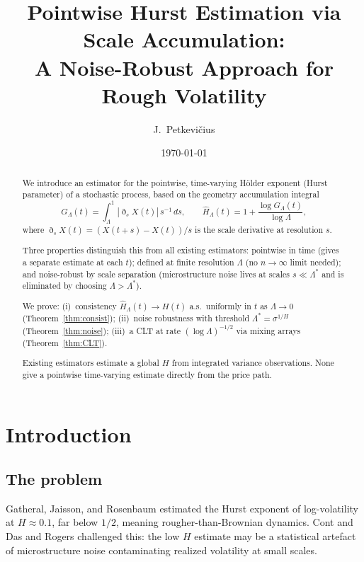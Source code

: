 \documentclass[11pt,a4paper]{article}
\title{Pointwise Hurst Estimation via Scale Accumulation:\\
A Noise-Robust Approach for Rough Volatility}
\author{J.\ Petkevi\v{c}ius}
\date{\today}
\theoremstyle{definition}
\theoremstyle{remark}
\newcommand{\GL}{G_\Lambda}
\newcommand{\Hhat}{\hat{H}_\Lambda}
\begin{document}
\maketitle

\begin{abstract}
We introduce an estimator for the pointwise, time-varying H\"{o}lder
exponent (Hurst parameter) of a stochastic process, based on the
geometry accumulation integral
\[
  \GL(t) = \int_\Lambda^1 |\eth_s X(t)|\,s^{-1}\,ds,
  \qquad
  \Hhat(t) = 1 + \frac{\log \GL(t)}{\log\Lambda},
\]
where $\eth_s X(t)=(X(t+s)-X(t))/s$ is the scale derivative at
resolution $s$.

Three properties distinguish this from all existing estimators:
pointwise in time (gives a separate estimate at each $t$); defined at
finite resolution $\Lambda$ (no $n\to\infty$ limit needed); and
noise-robust by scale separation (microstructure noise lives at scales
$s\ll\Lambda^*$ and is eliminated by choosing $\Lambda>\Lambda^*$).

We prove: (i)~consistency $\Hhat(t)\to H(t)$ a.s.\ uniformly in $t$
as $\Lambda\to0$ (Theorem~\ref{thm:consist}); (ii)~noise robustness
with threshold $\Lambda^*=\sigma^{1/H}$ (Theorem~\ref{thm:noise});
(iii)~a CLT at rate $(\log\Lambda)^{-1/2}$ via mixing arrays
(Theorem~\ref{thm:CLT}).

Existing estimators \cite{hanschied2023,hanschied2025,gatheral2018,
fukasawa2019,bolko2022,contdas2024,rogers2023} estimate a global $H$ from integrated variance
observations. None give a pointwise time-varying estimate directly from
the price path.
\end{abstract}

\tableofcontents
\newpage

\section{Introduction}

\subsection{The problem}

Gatheral, Jaisson, and Rosenbaum \cite{gatheral2018} estimated the
Hurst exponent of log-volatility at $H\approx0.1$, far below $1/2$,
meaning rougher-than-Brownian dynamics. Cont and Das \cite{contdas2024}
and Rogers \cite{rogers2023} challenged this: the low $H$ estimate may
be a statistical artefact of microstructure noise contaminating
realized volatility at small scales.
\end{document}
